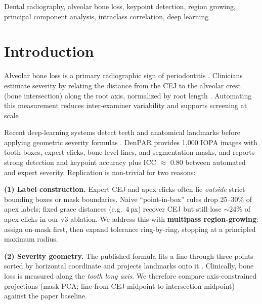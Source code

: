 \documentclass[conference]{IEEEtran}
\begin{document}
\begin{IEEEkeywords}
Dental radiography, alveolar bone loss, keypoint detection, region growing, principal component analysis, intraclass correlation, deep learning
\end{IEEEkeywords}

\section{Introduction}
\label{sec:intro}

Alveolar bone loss is a primary radiographic sign of periodontitis \cite{armitage2004periodontal_radiography}. Clinicians estimate severity by relating the distance from the CEJ to the alveolar crest (bone intersection) along the root axis, normalized by root length \cite{papageorgiou2021periodontal,estrela2016periapical}. Automating this measurement reduces inter-examiner variability and supports screening at scale \cite{mol2019ai_dental,schwendicke2020dl_dental}.

Recent deep-learning systems detect teeth and anatomical landmarks before applying geometric severity formulas \cite{denpar2026,tolstoy2021cej}. DenPAR provides 1{,}000 IOPA images with tooth boxes, expert clicks, bone-level lines, and segmentation masks, and reports strong detection and keypoint accuracy plus ICC $\approx$ 0.80 between automated and expert severity. Replication is non-trivial for two reasons:

\textbf{(1) Label construction.} Expert CEJ and apex clicks often lie \emph{outside} strict bounding boxes or mask boundaries. Naive ``point-in-box'' rules drop 25--30\% of apex labels; fixed grace distances (e.g.\ 4\,px) recover CEJ but still lose $\sim$24\% of apex clicks in our v3 ablation. We address this with \textbf{multipass region-growing}: assign on-mask first, then expand tolerance ring-by-ring, stopping at a principled maximum radius.

\textbf{(2) Severity geometry.} The published formula fits a line through three points sorted by horizontal coordinate and projects landmarks onto it \cite{denpar2026}. Clinically, bone loss is measured along the \emph{tooth long axis}. We therefore compare axis-constrained projections (mask PCA; line from CEJ midpoint to intersection midpoint) against the paper baseline.
\end{document}
